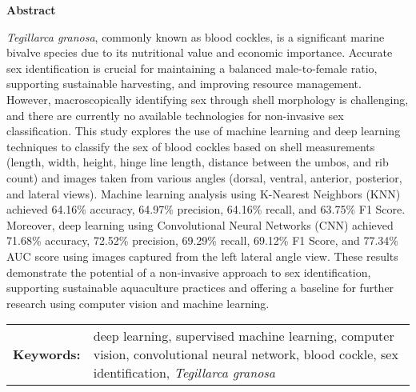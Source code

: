 \begin{center}
	\textbf{Abstract}
\end{center}
\setlength{\parindent}{0pt}
\textit{Tegillarca granosa}, commonly known as blood cockles, is a significant marine bivalve species due to its nutritional value and economic importance. Accurate sex identification is crucial for maintaining a balanced male-to-female ratio, supporting sustainable harvesting, and improving resource management. However, macroscopically identifying sex through shell morphology is challenging, and there are currently no available technologies for non-invasive sex classification. This study explores the use of machine learning and deep learning techniques to classify the sex of blood cockles based on shell measurements (length, width, height, hinge line length, distance between the umbos, and rib count) and images taken from various angles (dorsal, ventral, anterior, posterior, and lateral views). Machine learning analysis using K-Nearest Neighbors (KNN) achieved 64.16\% accuracy, 64.97\% precision, 64.16\% recall, and 63.75\% F1 Score. Moreover, deep learning using Convolutional Neural Networks (CNN) achieved 71.68\% accuracy, 72.52\% precision, 69.29\% recall, 69.12\% F1 Score, and 77.34\% AUC score using images captured from the left lateral angle view. These results demonstrate the potential of a non-invasive approach to sex identification, supporting sustainable aquaculture practices and offering a baseline for further research using computer vision and machine learning.

\begin{tabular}{lp{4.25in}}
	\hspace{-0.5em}\textbf{Keywords:}\hspace{0.25em} & deep learning, supervised machine learning, computer vision, convolutional neural network, blood cockle, sex identification, \textit{Tegillarca granosa}\\
\end{tabular}
